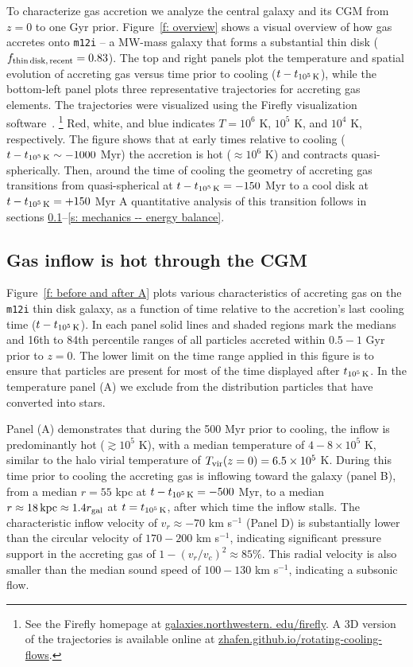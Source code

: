 \documentclass[fleqn,usenatbib]{mnras}
\newcommand{\tcon}{t_{10^5\,{\rm K}}}
\newcommand{\Tvir}{T_{\rm vir}}
\begin{document}
To characterize gas accretion we analyze the central galaxy and its CGM from $z=0$ to one Gyr prior.
Figure~\ref{f: overview} shows a visual overview of how gas accretes onto \texttt{m12i} -- a MW-mass galaxy that forms a substantial thin disk ($f_{\rm thin\,disk,\,recent} = 0.83$). 
The top and right panels plot the temperature and spatial evolution of accreting gas versus time prior to cooling ($t-\tcon$), while the bottom-left panel plots three representative trajectories for accreting gas elements.
The trajectories were visualized using the Firefly visualization software~\citep{Geller2018}.
\footnote{See the Firefly homepage at \url{galaxies.northwestern. edu/firefly}.
A 3D version of the trajectories is available online at \url{zhafen.github.io/rotating-cooling-flows}.}
Red, white, and blue indicates $T=10^6$ K, $10^5$ K, and $10^4$ K, respectively.
The figure shows that at early times relative to cooling ($t-\tcon \sim -1000$ Myr) the accretion is hot ($\approx10^6$ K) and contracts quasi-spherically.
Then, around the time of cooling the geometry of accreting gas transitions from quasi-spherical at $t - \tcon=-150$ Myr to a cool disk at $t - \tcon=+ 150$ Myr
A quantitative analysis of this transition follows in sections \ref{s: characteristics -- inflowing gas phase}--\ref{s: mechanics -- energy balance}.

\subsection{Gas inflow is hot through the CGM}
\label{s: characteristics -- inflowing gas phase}

Figure~\ref{f: before and after A} plots various characteristics of accreting gas on the \texttt{m12i} thin disk galaxy, as a function of time relative to the accretion's last cooling time ($t - \tcon$).
In each panel solid lines and shaded regions mark the medians and 16th to 84th percentile ranges of all particles accreted within $0.5-1$ Gyr prior to $z=0$.
The lower limit on the time range applied in this figure is to ensure that particles are present for most of the time displayed after $\tcon$.
In the temperature panel (A) we exclude from the distribution particles that have converted into stars. 

Panel (A) demonstrates that during the 500 Myr prior to cooling, the inflow is predominantly hot ($\gtrsim 10^5$ K), with a median temperature of $4-8\times10^5$ K, similar to the halo virial temperature of $\Tvir(z=0)=6.5\times10^5$ K.
During this time prior to cooling the accreting gas is inflowing toward the galaxy (panel B), from a median $r=55$ kpc at $t-\tcon=-500$ Myr, to a median $r\approx18\,{\rm kpc}\approx1.4 r_{\rm gal}$ at $t=\tcon$, after which time the inflow stalls.
The characteristic inflow velocity of $v_r \approx-70$ km s$^{-1}$ (Panel D) is substantially lower than the circular velocity of $170-200$ km s$^{-1}$, indicating significant pressure support in the accreting gas of $1-(v_r/v_c)^2\approx85\%$. This radial velocity is also smaller than the median sound speed of $100-130$ km s$^{-1}$, indicating a subsonic flow. 
\end{document}
